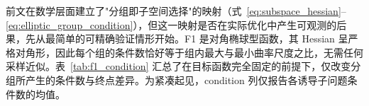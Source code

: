 前文在数学层面建立了"分组即子空间选择"的映射（式~\eqref{eq:subspace_hessian}--\eqref{eq:elliptic_group_condition}），但这一映射是否在实际优化中产生可观测的后果，先从最简单的可精确验证情形开始。F1 是对角椭球型函数，其 Hessian 呈严格对角形，因此每个组的条件数恰好等于组内最大与最小曲率尺度之比，无需任何采样近似。表~\ref{tab:f1_condition} 汇总了在目标函数完全固定的前提下，仅改变分组所产生的条件数与终点差异。为紧凑起见，condition 列仅报告各诱导子问题条件数的均值。
